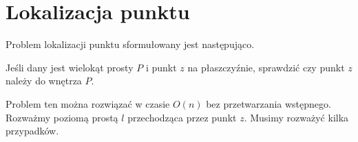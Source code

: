 \newcommand{\convexA}{
  \coordinate (p0) at (4.5,2);
  \coordinate (p1) at (4,3.25);
  \coordinate (p2) at (2,4);
  \coordinate (p3) at (1,3.5);
  \coordinate (p4) at (0,2);
  \coordinate (p5) at (2,0);
  \coordinate (p6) at (3.75,1);

  \draw (p0) -- (p1) -- (p2) -- (p3) -- (p4) -- (p5) -- (p6) -- cycle;
}

\newcommand{\convexB}{
  \coordinate (p0) at (3.5,     4);
  \coordinate (p1) at (1.5,     4.5);
  \coordinate (p2) at (0,       3.5);
  \coordinate (p3) at (-0.5,    1.5);
  \coordinate (p4) at (1.75,    0);
  \coordinate (p5) at (4,       1);

  \draw (p0) -- (p1) -- (p2) -- (p3) -- (p4) -- (p5) -- cycle;
}

\chapter{Lokalizacja punktu}
Problem lokalizacji punktu sformułowany jest następująco.

\begin{problem}
  Jeśli dany jest wielokąt prosty $P$ i punkt $z$ na płaszczyźnie,
  sprawdzić czy punkt $z$ należy do wnętrza $P$.
\end{problem}

Problem ten można rozwiązać w czasie $O(n)$ bez przetwarzania
wstępnego. Rozważmy poziomą prostą $l$ przechodząca przez punkt
$z$. Musimy rozważyć kilka przypadków.


